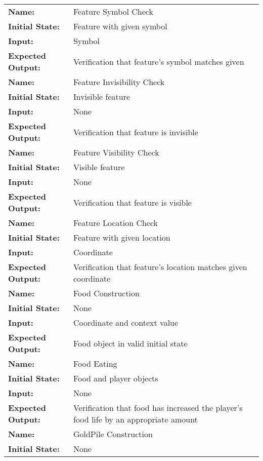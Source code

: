 \documentclass[12pt, titlepage]{article}
\begin{document}
\begin{center}
\begin{longtable}{ l | p{10cm} }
				\hline
				\rule{0pt}{1.5em}\textbf{Name:} & Feature Symbol Check\\
				\textbf{Initial State:} & Feature with given symbol\\
				\textbf{Input:} & Symbol\\
				\textbf{Expected Output:} & Verification that feature's symbol matches given\\[0.6em]
				\hline
				\rule{0pt}{1.5em}\textbf{Name:} & Feature Invisibility Check\\
				\textbf{Initial State:} & Invisible feature\\
				\textbf{Input:} & None\\
				\textbf{Expected Output:} & Verification that feature is invisible\\[0.6em]
				\hline
				\rule{0pt}{1.5em}\textbf{Name:} & Feature Visibility Check\\
				\textbf{Initial State:} & Visible feature\\
				\textbf{Input:} & None\\
				\textbf{Expected Output:} & Verification that feature is visible\\[0.6em]
				\hline
				\rule{0pt}{1.5em}\textbf{Name:} & Feature Location Check\\
				\textbf{Initial State:} & Feature with given location\\
				\textbf{Input:} & Coordinate\\
				\textbf{Expected Output:} & Verification that feature's location matches given coordinate\\[0.6em]
				\hline
				\rule{0pt}{1.5em}\textbf{Name:} & Food Construction\\
				\textbf{Initial State:} & None\\
				\textbf{Input:} & Coordinate and context value\\
				\textbf{Expected Output:} & Food object in valid initial state\\[0.6em]
				\hline
				\rule{0pt}{1.5em}\textbf{Name:} & Food Eating\\
				\textbf{Initial State:} & Food and player objects\\
				\textbf{Input:} & None\\
				\textbf{Expected Output:} & Verification that food has increased the player's food life by an appropriate amount\\[0.6em]
				\hline
				\rule{0pt}{1.5em}\textbf{Name:} & GoldPile Construction\\
				\textbf{Initial State:} & None\\

\end{longtable}
\end{center}
\end{document}
